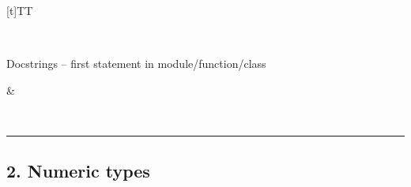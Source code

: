 \documentclass[a4paper,11pt,english]{sphinxmanual}
\begin{document}
\begin{savenotes}
\begin{tabulary}{\linewidth}[t]{TT}
\begin{varwidth}[t]{}
\sphinxAtStartPar
{}
\sphinxbeforeendvarwidth
\end{varwidth}%
\\
\sphinxhline\begin{varwidth}[t]{}
\sphinxAtStartPar
Docstrings – first statement in module/function/class
\sphinxbeforeendvarwidth
\end{varwidth}%
&\begin{varwidth}[t]{}
\sphinxAtStartPar
{}
\sphinxbeforeendvarwidth
\end{varwidth}%
\\
\sphinxbottomrule
\end{tabulary}
\sphinxtableafterendhook\par
\sphinxattableend\end{savenotes}


\bigskip\hrule\bigskip



\subsection{2. Numeric types}
\label{\detokenize{core_language/syntax_basic_types:numeric-types}}
\end{document}
